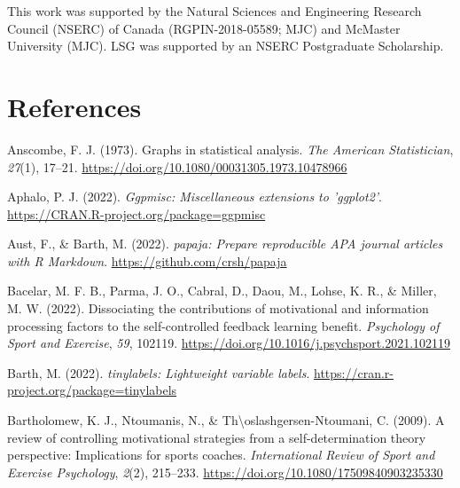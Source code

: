 \documentclass[
  doc, donotrepeattitle,floatsintext]{apa7}
\newlength{\cslhangindent}
\newlength{\cslentryspacingunit} %
\newenvironment{CSLReferences}[2] %
 {%
  \setlength{\parindent}{0pt}
  \ifodd #1
  \let\oldpar\par
  \def\par{\hangindent=\cslhangindent\oldpar}
  \fi
  \setlength{\parskip}{#2\cslentryspacingunit}
 }%
 {}
\begin{document}
\noindent This work was supported by the Natural Sciences and Engineering Research Council (NSERC) of Canada (RGPIN-2018-05589; MJC) and McMaster University (MJC). LSG was supported by an NSERC Postgraduate Scholarship.

\newpage

\hypertarget{references}{%
\section{References}\label{references}}

\vspace{2ex}

\hypertarget{refs}{}
\begin{CSLReferences}{1}{0}
\leavevmode{}%
Anscombe, F. J. (1973). Graphs in statistical analysis. \emph{The American Statistician}, \emph{27}(1), 17--21. \url{https://doi.org/10.1080/00031305.1973.10478966}

\leavevmode{}%
Aphalo, P. J. (2022). \emph{Ggpmisc: Miscellaneous extensions to 'ggplot2'}. \url{https://CRAN.R-project.org/package=ggpmisc}

\leavevmode{}%
Aust, F., \& Barth, M. (2022). \emph{{papaja}: {Prepare} reproducible {APA} journal articles with {R Markdown}}. \url{https://github.com/crsh/papaja}

\leavevmode{}%
Bacelar, M. F. B., Parma, J. O., Cabral, D., Daou, M., Lohse, K. R., \& Miller, M. W. (2022). Dissociating the contributions of motivational and information processing factors to the self-controlled feedback learning benefit. \emph{Psychology of Sport and Exercise}, \emph{59}, 102119. \url{https://doi.org/10.1016/j.psychsport.2021.102119}

\leavevmode{}%
Barth, M. (2022). \emph{{tinylabels}: Lightweight variable labels}. \url{https://cran.r-project.org/package=tinylabels}

\leavevmode{}%
Bartholomew, K. J., Ntoumanis, N., \& Th\textbackslash oslashgersen-Ntoumani, C. (2009). A review of controlling motivational strategies from a self-determination theory perspective: Implications for sports coaches. \emph{International Review of Sport and Exercise Psychology}, \emph{2}(2), 215--233. \url{https://doi.org/10.1080/17509840903235330}


\end{CSLReferences}
\end{document}
